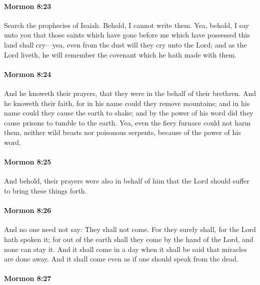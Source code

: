 		\paragraph{Mormon 8:23} %
			\label{MORMON-8-23}

			Search the prophecies of Isaiah.
			Behold, I cannot write them.
			Yea, behold, I say unto you
			that those saints which have gone before me
			which have possessed this land
			shall cry---yea, even from the dust will they cry unto the Lord;
			and as the Lord liveth,
			he will remember the covenant which he hath made with them.

		\paragraph{Mormon 8:24} %
			\label{MORMON-8-24}

			And he knoweth their prayers,
			that they were in the behalf of their brethren.
			And he knoweth their faith,
			for in his name could they remove mountains;
			and in his name could they cause the earth to shake;
			and by the power of his word did they cause prisons to tumble to the earth.
			Yea, even the fiery furnace could not harm them,
			neither wild beasts nor poisonous serpents,
			because of the power of his word.

		\paragraph{Mormon 8:25} %
			\label{MORMON-8-25}

			And behold, their prayers were also in behalf of him
			that the Lord should suffer to bring these things forth.

		\paragraph{Mormon 8:26} %
			\label{MORMON-8-26}

			And no one need not say:
			They shall not come.
			For they surely shall,
			for the Lord hath spoken it;
			for out of the earth shall they come by the hand of the Lord,
			and none can stay it.
			And it shall come in a day
			when it shall be said that miracles are done away.
			And it shall come even as if one should speak from the dead.

		\paragraph{Mormon 8:27} %
			\label{MORMON-8-27}

